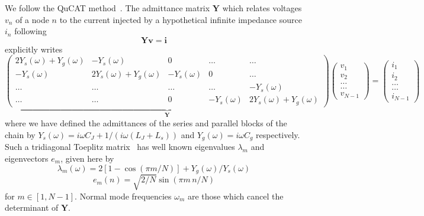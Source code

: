 We follow the QuCAT method~\cite{gely_qucatquantum_2019}.
%
The admittance matrix $\mathbf{Y}$ which relates voltages $v_n$ of a node $n$ to the current injected by a hypothetical infinite impedance source $i_n$ following
\begin{equation}
\mathbf{Y}\mathbf{v} = \mathbf{i}
\label{eq:v_to_i_relation}
\end{equation}
explicitly writes
\begin{equation}
%
\underbrace{\left(
	\begin{array}{ccccc}
	2Y_s(\omega)+Y_g (\omega)		&     - Y_s(\omega) 			&          0				&    \dots		&  \dots			\\
	-Y_s(\omega)				&        2Y_s(\omega)+Y_g (\omega)	&      - Y_s(\omega)				&     0		&  \dots			\\
	\dots			&      \dots			&    \dots				&    \dots		&  -Y_s(\omega)			\\
	\dots 			&      \dots			&       0				&  -Y_s(\omega)			&    2Y_s(\omega)+Y_g (\omega)  
	\end{array}
	\right)}_{\mathbf{Y}}
\left(
\begin{array}{c}
v_{1} \\
v_{2} \\
\dots \\
\dots\\
v_{N-1} 
\end{array}
\right)
=  
\left(
\begin{array}{c}
i_1\\
i_2\\
\dots \\
\dots\\
i_{N-1}
\end{array}
\right)
%
\label{eq:admittance_matrix}
\end{equation}
where we have defined the admittances of the series and parallel blocks of the chain by
$Y_s(\omega)  = i \omega C_J + 1/(i \omega (L_J+L_s))$ and 
$Y_g(\omega)  = i \omega C_g$
respectively.
%
Such a tridiagonal Toeplitz matrix~\cite{noschese_tridiagonaltoeplitz_2013} has well known eigenvalues $\lambda_m$ and eigenvectors $e_m$, given here by 
\begin{equation}
\lambda_m(\omega) =  2 \left[ 1 - \cos (\pi m/ N) \right] + Y_g(\omega)/Y_s (\omega)
\end{equation}
\begin{equation}
e_{m}(n)= \sqrt{2/N} \sin(\pi m \, n /N)
\end{equation}
for $m\in[1,N-1]$.
%
Normal mode frequencies $\omega_m$ are those which cancel the determinant of $\textbf{Y}$. 
